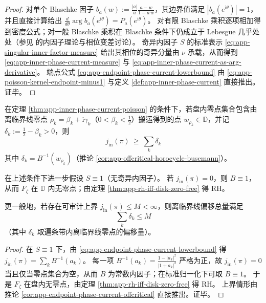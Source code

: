 \begin{proof}
对单个 Blaschke 因子 \(b_a(w):=\frac{|a|}{a}\frac{a-w}{1-\overline a\,w}\)，其边界值满足 \(|b_a(e^{\mathrm{i}\theta})|=1\)，并且直接计算给出
\(
\frac{d}{d\theta}\arg b_a(e^{\mathrm{i}\theta})=P_a(e^{\mathrm{i}\theta})
\)。
对有限 Blaschke 乘积逐项相加得到密度公式；对一般 Blaschke 乘积在 Blaschke 条件下仍成立于 Lebesgue 几乎处处（参见 \cite{Duren1970TheoryHp,Garnett2007BoundedAnalyticFunctions} 的内因子理论与相位变差讨论）。
奇异内因子 \(S\) 的标准表示 \eqref{eq:app-singular-inner-factor-measure} 给出其相位的奇异分量由 \(\nu\) 承载，从而得到 \eqref{eq:app-inner-phase-current-measure} 与 \eqref{eq:app-inner-phase-current-as-arg-derivative}。
端点公式 \eqref{eq:app-endpoint-phase-current-lowerbound} 由 \eqref{eq:app-poisson-kernel-endpoint-minus1} 与定义 \ref{def:app-inner-phase-current} 直接推出。证毕。
\end{proof}

\begin{corollary}[离临界线偏移的端点相位下界]\label{cor:app-endpoint-phase-current-offcritical}
在定理 \ref{thm:app-inner-phase-current-poisson} 的条件下，若盘内零点集合包含由离临界线零点 \(\rho_k=\beta_k+\mathrm{i}\gamma_k\)（\(0<\beta_k<\tfrac12\)）搬运得到的点 \(w_{\rho_k}\in\mathbb{D}\)，并记 \(\delta_k:=\tfrac12-\beta_k>0\)，则
\[
\boxed{\;
j_{\mathrm{in}}(\pi)\ \ge\ \sum_k \delta_k\;}
\]
其中 \(\delta_k=B^{-1}(w_{\rho_k})\)（推论 \ref{cor:app-offcritical-horocycle-busemann}）。
\end{corollary}

\begin{corollary}[端点相位证书]\label{cor:app-endpoint-phase-certificate}
在上述条件下进一步假设 \(S\equiv 1\)（无奇异内因子）。
若 \(j_{\mathrm{in}}(\pi)=0\)，则 \(B\equiv 1\)，从而 \(F_{\zeta}\) 在 \(\mathbb{D}\) 内无零点；由定理 \ref{thm:app-rh-iff-disk-zero-free} 得 RH。
\par
更一般地，若存在可审计上界 \(j_{\mathrm{in}}(\pi)\le M<\infty\)，则离临界线偏移总量满足
\[
\boxed{\;\sum_k \delta_k\le M\;}
\]
（其中 \(\delta_k\) 取遍条带内离临界线零点的偏移量）。
\end{corollary}

\begin{proof}
在 \(S\equiv 1\) 下，由 \eqref{eq:app-endpoint-phase-current-lowerbound} 得 \(j_{\mathrm{in}}(\pi)=\sum_k B^{-1}(a_k)\)。
每一项 \(B^{-1}(a_k)=\frac{1-|a_k|^2}{|1+a_k|^2}\) 严格为正，故 \(j_{\mathrm{in}}(\pi)=0\) 当且仅当零点集合为空，从而 \(B\) 为常数内因子；在标准归一化下可取 \(B\equiv 1\)。
于是 \(F_{\zeta}\) 在盘内无零点，由定理 \ref{thm:app-rh-iff-disk-zero-free} 得 RH。
上界情形由推论 \ref{cor:app-endpoint-phase-current-offcritical} 直接推出。证毕。
\end{proof}

